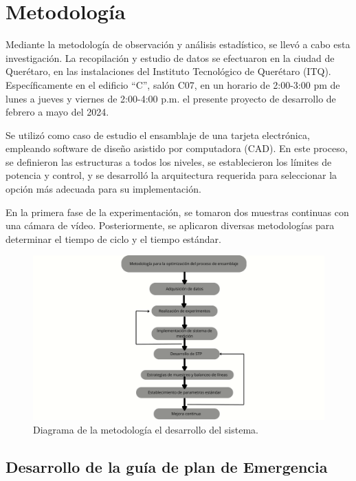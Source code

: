     \section{Metodología}
    
    
    Mediante la metodología de observación y análisis estadístico, se llevó a cabo esta investigación. La recopilación y estudio de datos se efectuaron en la ciudad de Querétaro, en las instalaciones del Instituto Tecnológico de Querétaro (ITQ). Específicamente en el edificio “C”, salón C07, en un horario de 2:00-3:00 pm de lunes a jueves y viernes de 2:00-4:00 p.m. el presente proyecto de desarrollo de febrero a mayo del 2024. 
    
    Se utilizó como caso de estudio el ensamblaje de una tarjeta electrónica, empleando software de diseño asistido por computadora (CAD). En este proceso, se definieron las estructuras a todos los niveles, se establecieron los límites de potencia y control, y se desarrolló la arquitectura requerida para seleccionar la opción más adecuada para su implementación.
    
    En la primera fase de la experimentación, se tomaron dos muestras continuas con una cámara de vídeo. Posteriormente, se aplicaron diversas metodologías para determinar el tiempo de ciclo y el tiempo estándar.
    
    \begin{figure}[H]
        \centering
        \includegraphics[scale=0.181]{21/img/diagramaMetodología.pdf}
        \caption{Diagrama de la metodología el desarrollo del sistema.}
        \label{fig:diagramaMetodologia}
    \end{figure}
    
    
    \subsection{Desarrollo de la guía de plan de Emergencia}
    
